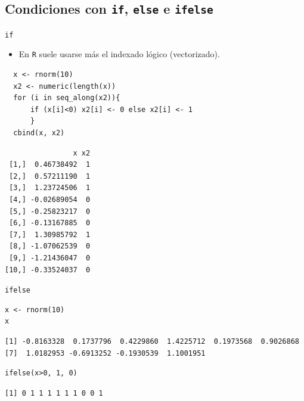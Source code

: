 \documentclass[xcolor={usenames,svgnames,dvipsnames}]{beamer}
\begin{document}
\subsection{Condiciones con \texttt{if}, \texttt{else} e \texttt{ifelse}}
\label{sec-4-4}
\begin{frame}[fragile,label=sec-4-4-1]{\texttt{if}}
 \begin{itemize}
\item En \texttt{R} suele usarse más el indexado lógico (vectorizado).
\end{itemize}
\lstset{language=R,label= ,caption= ,numbers=none}
\begin{lstlisting}
  x <- rnorm(10)
  x2 <- numeric(length(x))
  for (i in seq_along(x2)){
      if (x[i]<0) x2[i] <- 0 else x2[i] <- 1
      }
  cbind(x, x2)
\end{lstlisting}

\begin{verbatim}
                x x2
 [1,]  0.46738492  1
 [2,]  0.57211190  1
 [3,]  1.23724506  1
 [4,] -0.02689054  0
 [5,] -0.25823217  0
 [6,] -0.13167885  0
 [7,]  1.30985792  1
 [8,] -1.07062539  0
 [9,] -1.21436047  0
[10,] -0.33524037  0
\end{verbatim}
\end{frame}

\begin{frame}[fragile,label=sec-4-4-2]{\texttt{ifelse}}
 \lstset{language=R,label= ,caption= ,numbers=none}
\begin{lstlisting}
x <- rnorm(10)
x
\end{lstlisting}

\begin{verbatim}
[1] -0.8163328  0.1737796  0.4229860  1.4225712  0.1973568  0.9026868
[7]  1.0182953 -0.6913252 -0.1930539  1.1001951
\end{verbatim}

\lstset{language=R,label= ,caption= ,numbers=none}
\begin{lstlisting}
ifelse(x>0, 1, 0)
\end{lstlisting}

\begin{verbatim}
[1] 0 1 1 1 1 1 1 0 0 1
\end{verbatim}
\end{frame}
\end{document}
